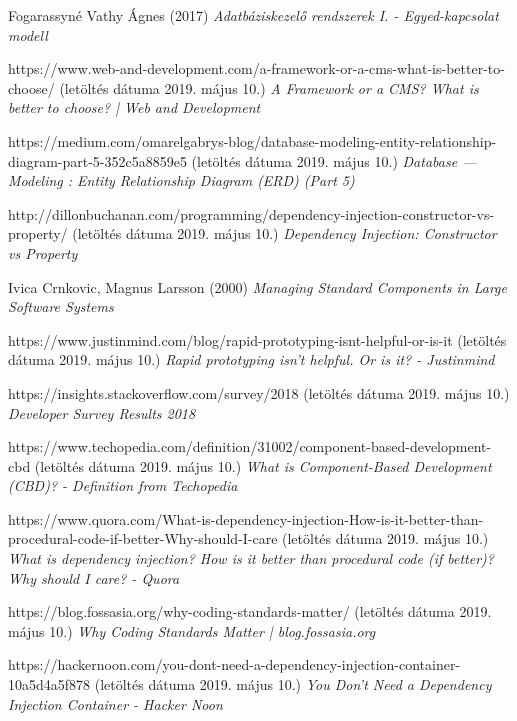 \documentclass[a4paper,12pt,oneside]{report}
\begin{document}
\newpage
\pagestyle{empty}
\setcounter{secnumdepth}{0}
\sectionfont{\rmfamily\bfseries\itshape\large}
\begin{thebibliography}{99}

		Fogarassyné Vathy Ágnes (2017)
		{\em Adatbáziskezelő rendszerek I. - Egyed-kapcsolat modell}

		https://www.web-and-development.com/a-framework-or-a-cms-what-is-better-to-choose/
		(letöltés dátuma 2019. május 10.)
		{\em A Framework or a CMS? What is better to choose? | Web and Development}

		https://medium.com/omarelgabrys-blog/database-modeling-entity-relationship-diagram-part-5-352c5a8859e5
		(letöltés dátuma 2019. május 10.)
		{\em Database — Modeling : Entity Relationship Diagram (ERD) (Part 5)}

		http://dillonbuchanan.com/programming/dependency-injection-constructor-vs-property/
		(letöltés dátuma 2019. május 10.)
		{\em Dependency Injection: Constructor vs Property}

		Ivica Crnkovic, Magnus Larsson (2000)
		{\em Managing Standard Components in Large Software Systems}

		https://www.justinmind.com/blog/rapid-prototyping-isnt-helpful-or-is-it
		(letöltés dátuma 2019. május 10.)
		{\em Rapid prototyping isn’t helpful. Or is it? - Justinmind}

        https://insights.stackoverflow.com/survey/2018
        (letöltés dátuma 2019. május 10.)
        {\em Developer Survey Results 2018}

		https://www.techopedia.com/definition/31002/component-based-development-cbd
		(letöltés dátuma 2019. május 10.)
		{\em What is Component-Based Development (CBD)? - Definition from Techopedia}

		https://www.quora.com/What-is-dependency-injection-How-is-it-better-than-procedural-code-if-better-Why-should-I-care
		(letöltés dátuma 2019. május 10.)
		{\em What is dependency injection? How is it better than procedural code (if better)? Why should I care? - Quora}

		https://blog.fossasia.org/why-coding-standards-matter/
		(letöltés dátuma 2019. május 10.)
		{\em Why Coding Standards Matter | blog.fossasia.org}

		https://hackernoon.com/you-dont-need-a-dependency-injection-container-10a5d4a5f878
		(letöltés dátuma 2019. május 10.)
		{\em You Don’t Need a Dependency Injection Container - Hacker Noon}


\end{thebibliography}
\end{document}
